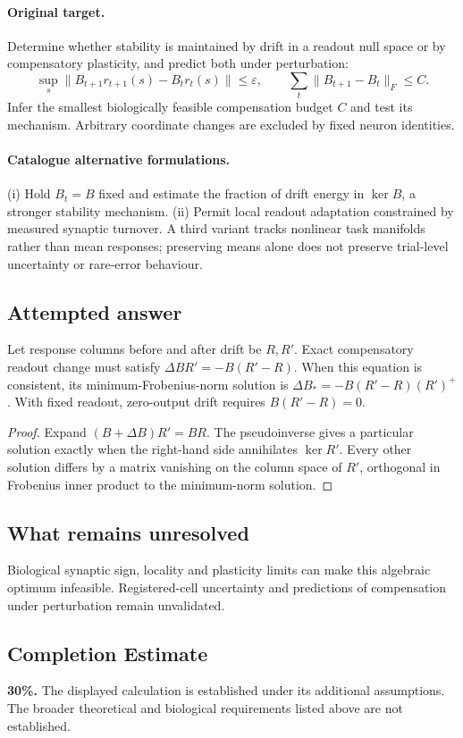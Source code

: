 \documentclass[11pt]{article}
\begin{document}
\paragraph{Original target.}
Determine whether stability is maintained by drift in a readout null space or by compensatory plasticity, and predict both under perturbation:
\[
\sup_s\|B_{t+1}r_{t+1}(s)-B_tr_t(s)\|\leq\varepsilon,
\qquad
\sum_t\|B_{t+1}-B_t\|_F\leq C.
\]
Infer the smallest biologically feasible compensation budget $C$ and test its mechanism. Arbitrary coordinate changes are excluded by fixed neuron identities.
\paragraph{Catalogue alternative formulations.}
(i) Hold $B_t=B$ fixed and estimate the fraction of drift energy in $\ker B$, a stronger stability mechanism. (ii) Permit local readout adaptation constrained by measured synaptic turnover. A third variant tracks nonlinear task manifolds rather than mean responses; preserving means alone does not preserve trial-level uncertainty or rare-error behaviour.
\subsection{Attempted answer}
\begin{proposition}
Let response columns before and after drift be $R,R\prime$. Exact compensatory readout change must satisfy $\Delta B R\prime=-B(R\prime-R)$. When this equation is consistent, its minimum-Frobenius-norm solution is $\Delta B_*=-B(R\prime-R)(R\prime)^+$. With fixed readout, zero-output drift requires $B(R\prime-R)=0$.
\end{proposition}
\begin{proof}
Expand $(B+\Delta B)R\prime=BR$. The pseudoinverse gives a particular solution exactly when the right-hand side annihilates $\ker R\prime$. Every other solution differs by a matrix vanishing on the column space of $R\prime$, orthogonal in Frobenius inner product to the minimum-norm solution.
\end{proof}
\subsection{What remains unresolved}
Biological synaptic sign, locality and plasticity limits can make this algebraic optimum infeasible. Registered-cell uncertainty and predictions of compensation under perturbation remain unvalidated.
\subsection{Completion Estimate}
\textbf{30\%.} The displayed calculation is established under its additional assumptions. The broader theoretical and biological requirements listed above are not established.
\end{document}
